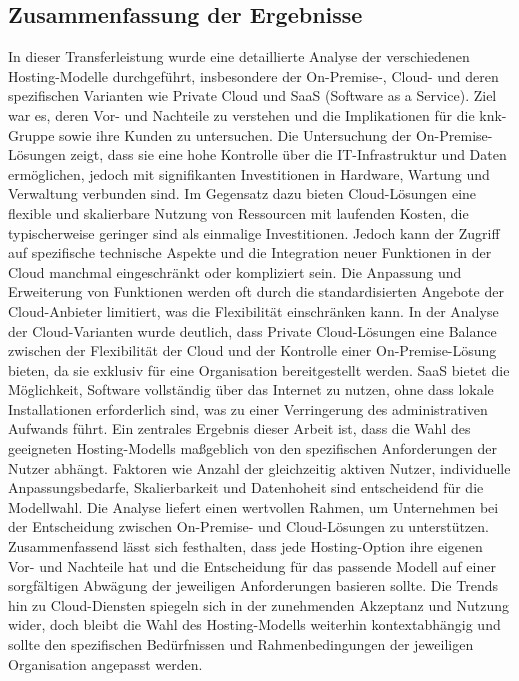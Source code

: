 \documentclass[12pt,bibtotoc]{article}
\begin{document}
		\subsection{Zusammenfassung der Ergebnisse}
		In dieser Transferleistung wurde eine detaillierte Analyse der verschiedenen Hosting-Modelle durchgeführt, insbesondere der On-Premise-, Cloud- und deren spezifischen Varianten wie Private Cloud und SaaS (Software as a Service). Ziel war es, deren Vor- und Nachteile zu verstehen und die Implikationen für die knk-Gruppe sowie ihre Kunden zu untersuchen. \newline
		Die Untersuchung der On-Premise-Lösungen zeigt, dass sie eine hohe Kontrolle über die IT-Infrastruktur und Daten ermöglichen, jedoch mit signifikanten Investitionen in Hardware, Wartung und Verwaltung verbunden sind. Im Gegensatz dazu bieten Cloud-Lösungen eine flexible und skalierbare Nutzung von Ressourcen mit laufenden Kosten, die typischerweise geringer sind als einmalige Investitionen.\newline
		Jedoch kann der Zugriff auf spezifische technische Aspekte und die Integration neuer Funktionen in der Cloud manchmal eingeschränkt oder kompliziert sein. Die Anpassung und Erweiterung von Funktionen werden oft durch die standardisierten Angebote der Cloud-Anbieter limitiert, was die Flexibilität einschränken kann.\newline
		In der Analyse der Cloud-Varianten wurde deutlich, dass Private Cloud-Lösungen eine Balance zwischen der Flexibilität der Cloud und der Kontrolle einer On-Premise-Lösung bieten, da sie exklusiv für eine Organisation bereitgestellt werden. SaaS bietet die Möglichkeit, Software vollständig über das Internet zu nutzen, ohne dass lokale Installationen erforderlich sind, was zu einer Verringerung des administrativen Aufwands führt.\newline
		Ein zentrales Ergebnis dieser Arbeit ist, dass die Wahl des geeigneten Hosting-Modells maßgeblich von den spezifischen Anforderungen der Nutzer abhängt. Faktoren wie Anzahl der gleichzeitig aktiven Nutzer, individuelle Anpassungsbedarfe, Skalierbarkeit und Datenhoheit sind entscheidend für die Modellwahl. Die Analyse liefert einen wertvollen Rahmen, um Unternehmen bei der Entscheidung zwischen On-Premise- und Cloud-Lösungen zu unterstützen.\newline
		Zusammenfassend lässt sich festhalten, dass jede Hosting-Option ihre eigenen Vor- und Nachteile hat und die Entscheidung für das passende Modell auf einer sorgfältigen Abwägung der jeweiligen Anforderungen basieren sollte. Die Trends hin zu Cloud-Diensten spiegeln sich in der zunehmenden Akzeptanz und Nutzung wider, doch bleibt die Wahl des Hosting-Modells weiterhin kontextabhängig und sollte den spezifischen Bedürfnissen und Rahmenbedingungen der jeweiligen Organisation angepasst werden.\newline
\end{document}
